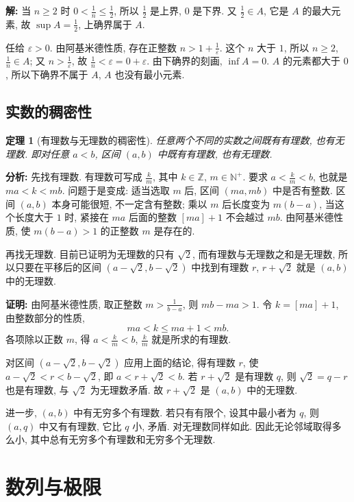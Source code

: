 \documentclass[UTF8,openany]{ctexbook}
\theoremstyle{chinesetextbook}
\newtheorem{theorem}{定理}[section]
\newenvironment{cnproof}{\par\indent\textbf{证明:} \ignorespaces}{\par}
\newenvironment{cnsolution}{\par\indent\textbf{解:} \ignorespaces}{\par}
\begin{document}
\begin{cnsolution}
当 $n\ge2$ 时 $\displaystyle0<\frac1n\le\frac12$, 所以 $\displaystyle\frac12$ 是上界, $0$ 是下界. 又 $\displaystyle\frac12\in A$, 它是 $A$ 的最大元素, 故 $\displaystyle\sup A=\frac12$, 上确界属于 $A$.

任给 $\varepsilon>0$. 由阿基米德性质, 存在正整数 $\displaystyle n>1+\frac1\varepsilon$. 这个 $n$ 大于 $1$, 所以 $n\ge2$, $\displaystyle\frac1n\in A$; 又 $\displaystyle n>\frac1\varepsilon$, 故 $\displaystyle\frac1n<\varepsilon=0+\varepsilon$. 由下确界的刻画, $\inf A=0$. $A$ 的元素都大于 $0$, 所以下确界不属于 $A$, $A$ 也没有最小元素.
\end{cnsolution}
\subsection{实数的稠密性}
\begin{theorem}[有理数与无理数的稠密性]
任意两个不同的实数之间既有有理数, 也有无理数. 即对任意 $a<b$, 区间 $(a,b)$ 中既有有理数, 也有无理数.
\end{theorem}
\par\indent\textbf{分析:} 先找有理数. 有理数可写成 $\displaystyle\frac km$, 其中 $k\in\mathbb Z$, $m\in\mathbb N^+$. 要求 $\displaystyle a<\frac km<b$, 也就是 $ma<k<mb$. 问题于是变成: 适当选取 $m$ 后, 区间 $(ma,mb)$ 中是否有整数. 区间 $(a,b)$ 本身可能很短, 不一定含有整数; 乘以 $m$ 后长度变为 $m(b-a)$, 当这个长度大于 $1$ 时, 紧接在 $ma$ 后面的整数 $[ma]+1$ 不会越过 $mb$. 由阿基米德性质, 使 $m(b-a)>1$ 的正整数 $m$ 是存在的.

再找无理数. 目前已证明为无理数的只有 $\sqrt2$, 而有理数与无理数之和是无理数, 所以只要在平移后的区间 $(a-\sqrt2,b-\sqrt2)$ 中找到有理数 $r$, $r+\sqrt2$ 就是 $(a,b)$ 中的无理数.
\begin{cnproof}
由阿基米德性质, 取正整数 $\displaystyle m>\frac1{b-a}$, 则 $mb-ma>1$. 令 $k=[ma]+1$, 由整数部分的性质,
\[
ma<k\le ma+1<mb.
\]
各项除以正数 $m$, 得 $\displaystyle a<\frac km<b$, $\displaystyle\frac km$ 就是所求的有理数.

对区间 $(a-\sqrt2,b-\sqrt2)$ 应用上面的结论, 得有理数 $r$, 使 $a-\sqrt2<r<b-\sqrt2$, 即 $a<r+\sqrt2<b$. 若 $r+\sqrt2$ 是有理数 $q$, 则 $\sqrt2=q-r$ 也是有理数, 与 $\sqrt2$ 为无理数矛盾. 故 $r+\sqrt2$ 是 $(a,b)$ 中的无理数.
\end{cnproof}
进一步, $(a,b)$ 中有无穷多个有理数. 若只有有限个, 设其中最小者为 $q$, 则 $(a,q)$ 中又有有理数, 它比 $q$ 小, 矛盾. 对无理数同样如此. 因此无论邻域取得多么小, 其中总有无穷多个有理数和无穷多个无理数.
\section{数列与极限}
\end{document}
